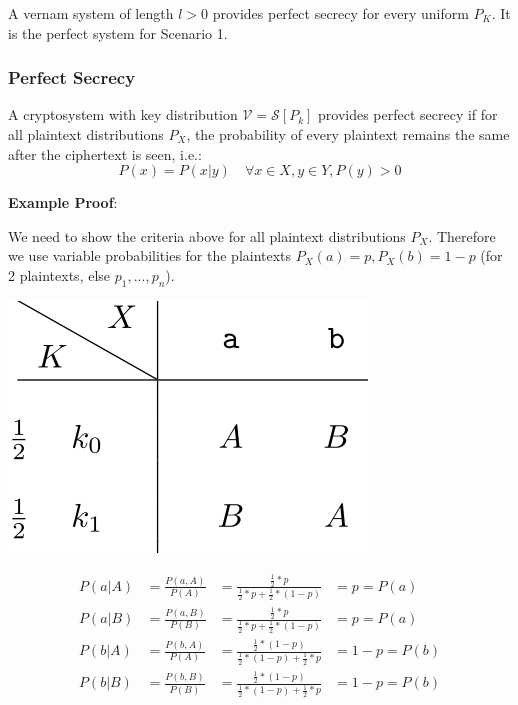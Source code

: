 A vernam system of length \(l>0\) provides perfect secrecy for every
uniform \(P_K\). It is the perfect system for Scenario 1.

\hypertarget{perfect-secrecy}{%
\subsubsection{Perfect Secrecy}\label{perfect-secrecy}}

A cryptosystem with key distribution \(\mathcal{V} = \mathcal{S}[P_k]\)
provides perfect secrecy if for all plaintext distributions \(P_X\), the
probability of every plaintext remains the same after the ciphertext is
seen, i.e.: \[P(x) = P(x | y) \quad \forall x \in X, y \in Y, P(y) > 0\]

\textbf{Example Proof}:

We need to show the criteria above for all plaintext distributions
\(P_X\). Therefore we use variable probabilities for the plaintexts
\(P_X(a) = p, P_X(b) = 1-p\) (for 2 plaintexts, else \(p_1, ..., p_n\)).

\begin{minipage}{.35\linewidth}
    \centering
    \includegraphics[width=\linewidth]{img/perfect_secrecy_example}
\end{minipage}
\begin{minipage}{.63\linewidth}
    \begin{align*}
        P(a | A) &= \frac{P(a, A)}{P(A)} &= \frac{\frac{1}{2} * p}{\frac{1}{2} * p + \frac{1}{2} * (1-p)} &= p = P(a)\\
        P(a | B) &= \frac{P(a, B)}{P(B)} &= \frac{\frac{1}{2} * p}{\frac{1}{2} * p + \frac{1}{2} * (1-p)} &= p = P(a)\\
        P(b | A) &= \frac{P(b, A)}{P(A)} &= \frac{\frac{1}{2} * (1-p)}{\frac{1}{2} * (1-p) + \frac{1}{2} * p} &= 1-p = P(b)\\
        P(b | B) &= \frac{P(b, B)}{P(B)} &= \frac{\frac{1}{2} * (1-p)}{\frac{1}{2} * (1-p) + \frac{1}{2} * p} &= 1-p = P(b)
    \end{align*}
\end{minipage}
\newline

